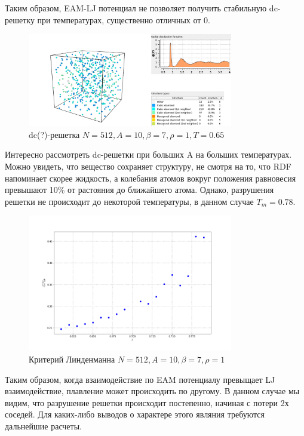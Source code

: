 \documentclass[12pt]{article}
\begin{document}
Таким образом, EAM-LJ потенциал не позволяет получить стабильную dc-решетку при температурах, существенно отличных от 0.

\begin{figure}[h]
\centering
\includegraphics[width=0.8\textwidth]{temp_all}
\caption{dc(?)-решетка $N=512, A=10, \beta=7, \rho=1, T=0.65$}
\end{figure}
\FloatBarrier

Интересно рассмотреть dc-решетки при больших A на больших температурах. Можно увидеть, что вещество сохраняет структуру, не смотря на то, что RDF напоминает скорее жидкость, а колебания атомов вокруг положения равновесия превышают 10\% от растояния до ближайшего атома. Однако, разрушения решетки не происходит до некоторой температуры, в данном случае $T_m=0.78$.

\begin{figure}[h]
\centering
\includegraphics[width=0.8\textwidth]{lind_high}
\caption{Критерий Линденманна $N=512, A=10, \beta=7, \rho=1$}
\end{figure}
\FloatBarrier

Таким образом, когда взаимодействие по EAM потенциалу превыщает LJ взаимодействие, плавление может происходить по другому. В данном случае мы видим, что разрушение решетки происходит постепенно, начиная с потери 2х соседей. Для каких-либо выводов о характере этого являния требуются дальнейшие расчеты.
\end{document}
